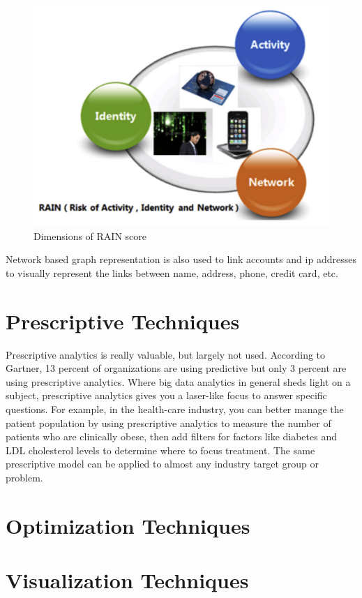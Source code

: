 \begin{figure}[H]
	\includegraphics[scale = 0.8]{figures/RAIN_dimension.png}
	\centering
	\caption{Dimensions of RAIN score}
	\label{fig:rain_dimension}
\end{figure}

Network based graph representation is also used to link accounts and ip addresses to visually represent the links between name, address, phone, credit card, etc.

\chapter{Prescriptive Techniques}
\label{prescriptive-techniques}

Prescriptive analytics is really valuable, but largely not used. According to Gartner, 13 percent of organizations are using predictive but only 3 percent are using prescriptive analytics. Where big data analytics in general sheds light on a subject, prescriptive analytics gives you a laser-like focus to answer specific questions. For example, in the health-care industry, you can better manage the patient population by using prescriptive analytics to measure the number of patients who are clinically obese, then add filters for factors like diabetes and LDL cholesterol levels to determine where to focus treatment. The same prescriptive model can be applied to almost any industry target group or problem.




%
%
%
%

\setlength{\footskip}{8mm}

\chapter{Optimization Techniques} 
\label{optimization-techniques}





%
%
%
%

\setlength{\footskip}{8mm}

\chapter{Visualization Techniques} 
\label{visualization-techniques}





%
%
%
%

\setlength{\footskip}{8mm}

